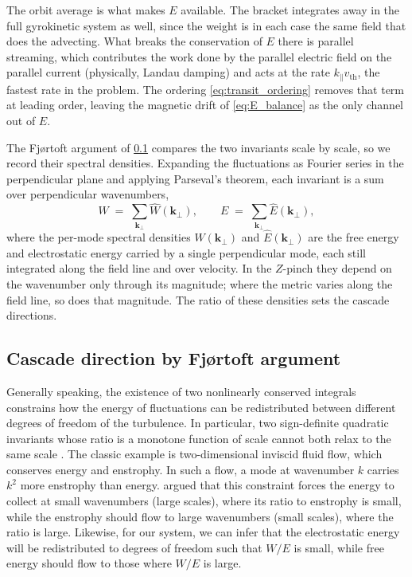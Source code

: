 \documentclass{jpp}
\renewcommand{\vec}[1]{\boldsymbol{#1}}
\newcommand{\vec}[1]{\boldsymbol{#1}}
\newcommand{\kpar}{k_\parallel}
\begin{document}
The orbit average is what makes $E$ available. The bracket integrates away in the full gyrokinetic system as well, since the weight is in each case the same field that does the advecting. What breaks the conservation of $E$ there is parallel streaming, which contributes the work done by the parallel electric field on the parallel current (physically, Landau damping) and acts at the rate $\kpar v_\mathrm{th}$, the fastest rate in the problem. The ordering \cref{eq:transit_ordering} removes that term at leading order, leaving the magnetic drift of \cref{eq:E_balance} as the only channel out of $E$.

The Fj\o rtoft argument of \cref{sec:fjortoft} compares the two invariants scale by scale, so we record their spectral densities. Expanding the fluctuations as Fourier series in the perpendicular plane and applying Parseval's theorem, each invariant is a sum over perpendicular wavenumbers,
\begin{equation}\label{eq:spectral_densities}
W \;=\; \sum_{\vec k_\perp} \hat W(\vec k_\perp),
\qquad
E \;=\; \sum_{\vec k_\perp} \hat E(\vec k_\perp),
\end{equation}
where the per-mode spectral densities $\hat W(\vec k_\perp)$ and $\hat E(\vec k_\perp)$ are the free energy and electrostatic energy carried by a single perpendicular mode, each still integrated along the field line and over velocity. In the $Z$-pinch they depend on the wavenumber only through its magnitude; where the metric varies along the field line, so does that magnitude. The ratio of these densities sets the cascade directions.

\subsection{Cascade direction by Fj\o rtoft argument}\label{sec:fjortoft}

Generally speaking, the existence of two nonlinearly conserved integrals constrains
how the energy of fluctuations can be redistributed between different degrees of freedom
of the turbulence. In particular, two sign-definite quadratic invariants whose ratio is a
monotone function of scale cannot both relax to the same scale \citep{Fjortoft1953}. The classic example is two-dimensional inviscid fluid flow, which conserves energy and enstrophy. In such a flow, a mode at wavenumber $k$ carries $k^2$ more enstrophy than energy. \citet{Fjortoft1953} argued that this constraint forces the energy to collect at small wavenumbers (large scales), where its ratio to enstrophy is small, while the enstrophy should flow to large wavenumbers (small scales), where the ratio is large. Likewise, for our system, we can infer that the electrostatic energy will be redistributed to degrees of freedom such that $W/E$ is small, while free energy should flow to those where $W/E$ is large.
\end{document}
